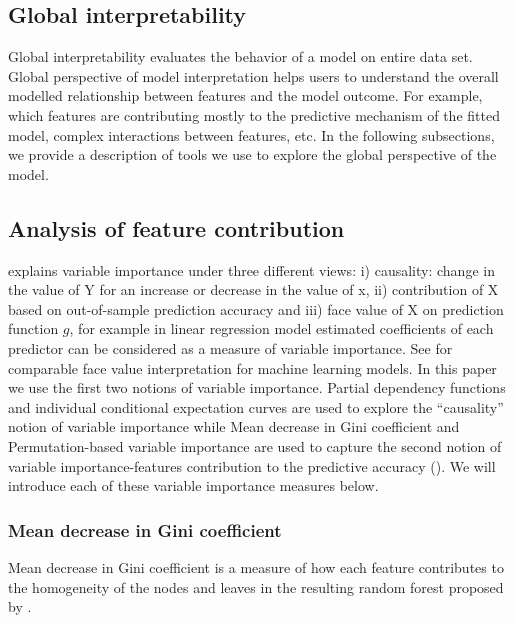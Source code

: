 \documentclass[11pt,a4paper,]{article}
\begin{document}
\subsection{Global interpretability}\label{global-interpretability}

Global interpretability evaluates the behavior of a model on entire data
set. Global perspective of model interpretation helps users to
understand the overall modelled relationship between features and the
model outcome. For example, which features are contributing mostly to
the predictive mechanism of the fitted model, complex interactions
between features, etc. In the following subsections, we provide a
description of tools we use to explore the global perspective of the
model.

\subsection{Analysis of feature
contribution}\label{analysis-of-feature-contribution}

\textcite{jiang2002} explains variable importance under three different
views: i) causality: change in the value of Y for an increase or
decrease in the value of x, ii) contribution of X based on out-of-sample
prediction accuracy and iii) face value of X on prediction function
\(g\), for example in linear regression model estimated coefficients of
each predictor can be considered as a measure of variable importance.
See \textcite{jiang2002} for comparable face value interpretation for
machine learning models. In this paper we use the first two notions of
variable importance. Partial dependency functions and individual
conditional expectation curves are used to explore the ``causality''
notion of variable importance while Mean decrease in Gini coefficient
and Permutation-based variable importance are used to capture the second
notion of variable importance-features contribution to the predictive
accuracy (\textcite{Zhao}). We will introduce each of these variable
importance measures below.

\subsubsection{Mean decrease in Gini
coefficient}\label{mean-decrease-in-gini-coefficient}

Mean decrease in Gini coefficient is a measure of how each feature
contributes to the homogeneity of the nodes and leaves in the resulting
random forest proposed by \textcite{breiman2001random}.
\end{document}
